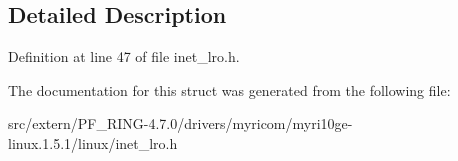 \subsection{Detailed Description}


Definition at line 47 of file inet\_\-lro.h.



The documentation for this struct was generated from the following file:\begin{DoxyCompactItemize}
\item 
src/extern/PF\_\-RING-\/4.7.0/drivers/myricom/myri10ge-\/linux.1.5.1/linux/inet\_\-lro.h\end{DoxyCompactItemize}
